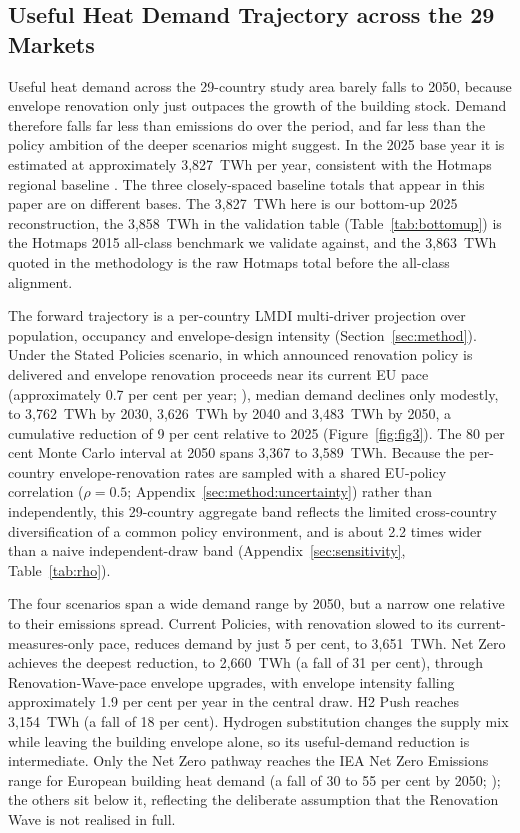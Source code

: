 \subsection{Useful Heat Demand Trajectory across the 29 Markets}
\label{sec:results:demand}

Useful heat demand across the 29-country study area barely falls to 2050, because
envelope renovation only just outpaces the growth of the building stock. Demand
therefore falls far less than emissions do over the period, and far less than the policy
ambition of the deeper scenarios might suggest. In the 2025 base year it is estimated at
approximately 3,827~TWh per year, consistent with the Hotmaps regional baseline
\citep{Hotmaps2019}. The three closely-spaced baseline totals that appear in this paper
are on different bases. The 3,827~TWh here is our bottom-up 2025
reconstruction, the 3,858~TWh in the validation table (Table~\ref{tab:bottomup}) is the
Hotmaps 2015 all-class benchmark we validate against, and the 3,863~TWh quoted in the
methodology is the raw Hotmaps total before the all-class alignment.

The forward trajectory is a per-country LMDI multi-driver projection over population,
occupancy and envelope-design intensity (Section~\ref{sec:method}). Under the Stated
Policies scenario, in which announced renovation policy is delivered and envelope
renovation proceeds near its current EU pace (approximately 0.7 per cent per year;
\citep{BPIE2024Tracker}), median demand declines only modestly, to 3,762~TWh by 2030,
3,626~TWh by 2040 and 3,483~TWh by 2050, a cumulative reduction of 9 per cent relative
to 2025 (Figure~\ref{fig:fig3}). The 80 per cent Monte Carlo interval at 2050 spans
3,367 to 3,589~TWh. Because the per-country envelope-renovation rates are sampled with a
shared EU-policy correlation ($\rho=0.5$; Appendix~\ref{sec:method:uncertainty}) rather
than independently, this 29-country aggregate band reflects the limited cross-country
diversification of a common policy environment, and is about 2.2 times wider than a
naive independent-draw band (Appendix~\ref{sec:sensitivity}, Table~\ref{tab:rho}).

The four scenarios span a wide demand range by 2050, but a narrow one relative to
their emissions spread. Current Policies, with renovation slowed to its
current-measures-only pace, reduces demand by just 5 per cent, to 3,651~TWh. Net
Zero achieves the deepest reduction, to 2,660~TWh (a fall of 31 per cent),
through Renovation-Wave-pace envelope upgrades, with envelope intensity falling
approximately 1.9 per cent per year in the central draw. H2 Push reaches
3,154~TWh (a fall of 18 per cent). Hydrogen substitution changes the supply mix while leaving the
building envelope alone, so its useful-demand reduction is intermediate.
Only the Net Zero pathway reaches the IEA Net Zero Emissions range for European
building heat demand (a fall of 30 to 55 per cent by 2050;
\citep{IEA2023NZE}); the others sit below it, reflecting the deliberate
assumption that the Renovation Wave is not realised in full.


